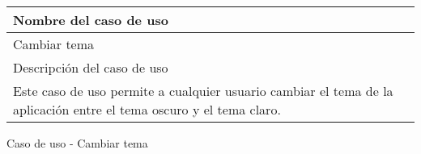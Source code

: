 \begin{identificacionCasoDeUso}
	\begin{tabular} { | p{17cm} |}
		\hline
		Nombre del caso de uso                                                                                              \\ \hline
		Cambiar tema                                                                                                        \\ \hline
		Descripción del caso de uso                                                                                         \\ \hline
		Este caso de uso permite a cualquier usuario cambiar el tema de la aplicación entre el tema oscuro y el tema claro. \\ \hline
	\end{tabular}
	\caption{Caso de uso - Cambiar tema}
\end{identificacionCasoDeUso}